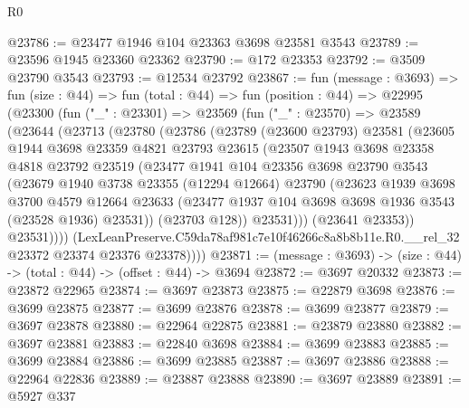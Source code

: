 \begin{lexlean}{R0}
\begin{coremodule}
@23786 := @23477 @1946 @104 @23363 @3698 @23581 @3543
@23789 := @23596 @1945 @23360 @23362
@23790 := @172 @23353
@23792 := @3509 @23790 @3543
@23793 := @12534 @23792
@23867 := fun (message : @3693) =>
  fun (size : @44) =>
  fun (total : @44) =>
  fun (position : @44) =>
  @22995
    (@23300
      (fun ("_" : @23301) =>
      @23569
        (fun ("_" : @23570) =>
        @23589
          (@23644
            (@23713
              (@23780
                (@23786
                  (@23789
                    (@23600 @23793)
                    @23581
                    (@23605
                      @1944
                      @3698
                      @23359
                      @4821
                      @23793
                      @23615
                      (@23507
                        @1943
                        @3698
                        @23358
                        @4818
                        @23792
                        @23519
                        (@23477
                          @1941
                          @104
                          @23356
                          @3698
                          @23790
                          @3543
                          (@23679
                            @1940
                            @3738
                            @23355
                            (@12294 @12664)
                            @23790
                            (@23623
                              @1939
                              @3698
                              @3700
                              @4579
                              @12664
                              @23633
                              (@23477 @1937 @104 @3698 @3698 @1936 @3543 (@23528 @1936) @23531))
                            (@23703 @128))
                          @23531)))
                    (@23641 @23353))
                  @23531))))
          (LexLeanPreserve.C59da78af981c7e10f46266c8a8b8b11e.R0.__rel_32
            @23372
            @23374
            @23376
            @23378))))
@23871 := (message : @3693) -> (size : @44) -> (total : @44) -> (offset : @44) -> @3694
@23872 := @3697 @20332
@23873 := @23872 @22965
@23874 := @3697 @23873
@23875 := @22879 @3698
@23876 := @3699 @23875
@23877 := @3699 @23876
@23878 := @3699 @23877
@23879 := @3697 @23878
@23880 := @22964 @22875
@23881 := @23879 @23880
@23882 := @3697 @23881
@23883 := @22840 @3698
@23884 := @3699 @23883
@23885 := @3699 @23884
@23886 := @3699 @23885
@23887 := @3697 @23886
@23888 := @22964 @22836
@23889 := @23887 @23888
@23890 := @3697 @23889
@23891 := @5927 @337

\end{coremodule}
\end{lexlean}
